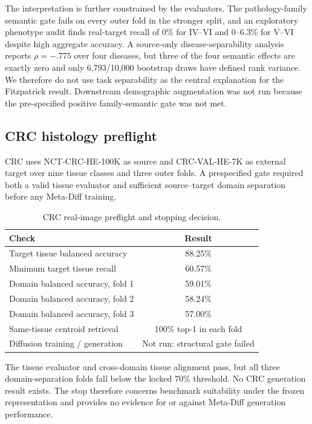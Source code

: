 The interpretation is further constrained by the evaluators. The pathology-family semantic gate fails on every outer fold in the stronger split, and an exploratory phenotype audit finds real-target recall of 0\% for IV--VI and 0--6.3\% for V--VI despite high aggregate accuracy. A source-only disease-separability analysis reports $\rho=-.775$ over four diseases, but three of the four semantic effects are exactly zero and only 6,793/10,000 bootstrap draws have defined rank variance. We therefore do not use task separability as the central explanation for the Fitzpatrick result. Downstream demographic augmentation was not run because the pre-specified positive family-semantic gate was not met.

\subsection{CRC histology preflight}
CRC uses NCT-CRC-HE-100K as source and CRC-VAL-HE-7K as external target over nine tissue classes and three outer folds. A prespecified gate required both a valid tissue evaluator and sufficient source--target domain separation before any Meta-Diff training.

\begin{table}[h]
\centering\small
\caption{CRC real-image preflight and stopping decision.}
\begin{tabular}{lc}
\toprule
Check & Result\\
\midrule
Target tissue balanced accuracy & 88.25\%\\
Minimum target tissue recall & 60.57\%\\
Domain balanced accuracy, fold 1 & 59.01\%\\
Domain balanced accuracy, fold 2 & 58.24\%\\
Domain balanced accuracy, fold 3 & 57.00\%\\
Same-tissue centroid retrieval & 100\% top-1 in each fold\\
Diffusion training / generation & Not run: structural gate failed\\
\bottomrule
\end{tabular}
\end{table}

The tissue evaluator and cross-domain tissue alignment pass, but all three domain-separation folds fall below the locked 70\% threshold. No CRC generation result exists. The stop therefore concerns benchmark suitability under the frozen representation and provides no evidence for or against Meta-Diff generation performance.

